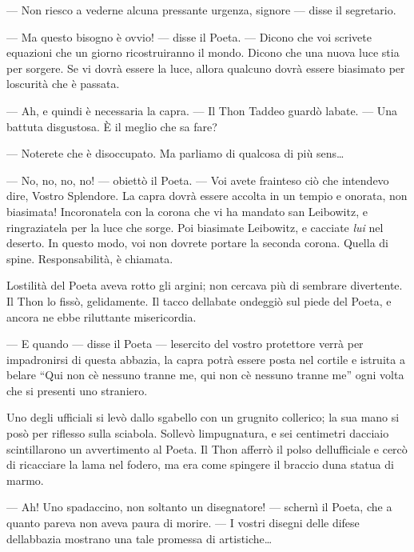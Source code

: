 --- Non riesco a vederne alcuna pressante urgenza, signore --- disse il
segretario.

--- Ma questo bisogno è ovvio! --- disse il Poeta. --- Dicono che voi
scrivete equazioni che un giorno ricostruiranno il mondo. Dicono che una
nuova luce stia per sorgere. Se vi dovrà essere la luce, allora qualcuno
dovrà essere biasimato per l\textquotesingle oscurità che è passata.

--- Ah, e quindi è necessaria la capra. --- Il Thon Taddeo guardò
l\textquotesingle abate. --- Una battuta disgustosa. È il meglio che sa
fare?

--- Noterete che è disoccupato. Ma parliamo di qualcosa di più
sens\ldots{}

--- No, no, no, no! --- obiettò il Poeta. --- Voi avete frainteso ciò
che intendevo dire, Vostro Splendore. La capra dovrà essere accolta in
un tempio e onorata, non biasimata! Incoronatela con la corona che vi ha
mandato san Leibowitz, e ringraziatela per la luce che sorge. Poi
biasimate Leibowitz, e cacciate \emph{lui} nel deserto. In questo modo,
voi non dovrete portare la seconda corona. Quella di spine.
Responsabilità, è chiamata.

L\textquotesingle ostilità del Poeta aveva rotto gli argini; non cercava
più di sembrare divertente. Il Thon lo fissò, gelidamente. Il tacco
dell\textquotesingle abate ondeggiò sul piede del Poeta, e ancora ne
ebbe riluttante misericordia.

--- E quando --- disse il Poeta --- l\textquotesingle esercito del
vostro protettore verrà per impadronirsi di questa abbazia, la capra
potrà essere posta nel cortile e istruita a belare ``Qui non
c\textquotesingle è nessuno tranne me, qui non c\textquotesingle è
nessuno tranne me'' ogni volta che si presenti uno straniero.

Uno degli ufficiali si levò dallo sgabello con un grugnito collerico; la
sua mano si posò per riflesso sulla sciabola. Sollevò
l\textquotesingle impugnatura, e sei centimetri
d\textquotesingle acciaio scintillarono un avvertimento al Poeta. Il
Thon afferrò il polso dell\textquotesingle ufficiale e cercò di
ricacciare la lama nel fodero, ma era come spingere il braccio
d\textquotesingle una statua di marmo.

--- Ah! Uno spadaccino, non soltanto un disegnatore! --- schernì il
Poeta, che a quanto pareva non aveva paura di morire. --- I vostri
disegni delle difese dell\textquotesingle abbazia mostrano una tale
promessa di artistiche\ldots{}

